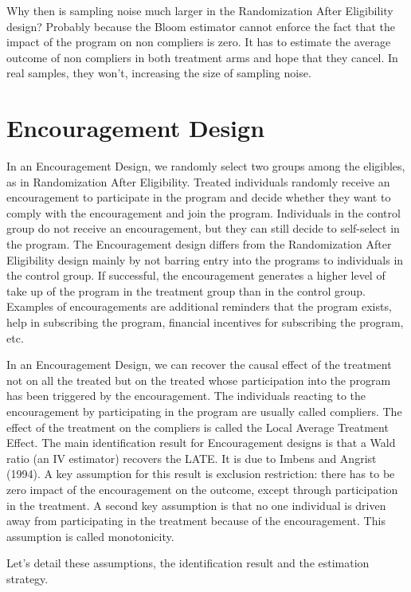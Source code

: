 \documentclass[]{book}
\theoremstyle{definition}
\theoremstyle{definition}
\theoremstyle{definition}
\theoremstyle{remark}
\begin{document}
Why then is sampling noise much larger in the Randomization After Eligibility design?
Probably because the Bloom estimator cannot enforce the fact that the impact of the program on non compliers is zero.
It has to estimate the average outcome of non compliers in both treatment arms and hope that they cancel.
In real samples, they won't, increasing the size of sampling noise.

\hypertarget{sec:design4}{%
\section{Encouragement Design}\label{sec:design4}}

In an Encouragement Design, we randomly select two groups among the eligibles, as in Randomization After Eligibility.
Treated individuals randomly receive an encouragement to participate in the program and decide whether they want to comply with the encouragement and join the program.
Individuals in the control group do not receive an encouragement, but they can still decide to self-select in the program.
The Encouragement design differs from the Randomization After Eligibility design mainly by not barring entry into the programs to individuals in the control group.
If successful, the encouragement generates a higher level of take up of the program in the treatment group than in the control group.
Examples of encouragements are additional reminders that the program exists, help in subscribing the program, financial incentives for subscribing the program, etc.

In an Encouragement Design, we can recover the causal effect of the treatment not on all the treated but on the treated whose participation into the program has been triggered by the encouragement.
The individuals reacting to the encouragement by participating in the program are usually called compliers.
The effect of the treatment on the compliers is called the Local Average Treatment Effect.
The main identification result for Encouragement designs is that a Wald ratio (an IV estimator) recovers the LATE.
It is due to Imbens and Angrist (1994).
A key assumption for this result is exclusion restriction: there has to be zero impact of the encouragement on the outcome, except through participation in the treatment.
A second key assumption is that no one individual is driven away from participating in the treatment because of the encouragement.
This assumption is called monotonicity.

Let's detail these assumptions, the identification result and the estimation strategy.
\end{document}

